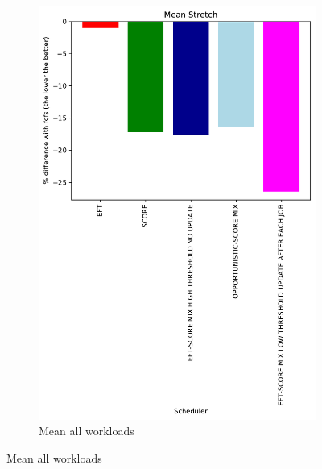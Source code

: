 \documentclass[a4paper]{article}
\begin{document}
\begin{figure}[H]\centering
\begin{subfigure}[b]{0.4\linewidth}\centering\includegraphics[width=1\linewidth]{MBSS/plot/Results_Percentage_FCFS_All_workloads_mean_Mean_Stretch_450_128_32_256_4_1024.pdf}\caption{Mean all workloads}\end{subfigure}

\end{figure}
\end{document}
